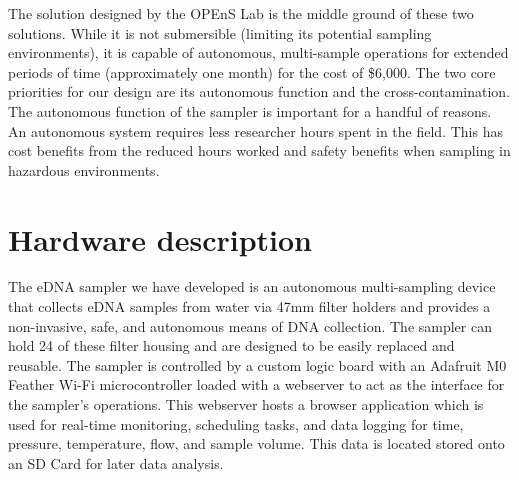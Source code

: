 \documentclass[11pt, letterpaper]{article}
\begin{document}
The solution designed by the OPEnS Lab is the middle ground of these two solutions. While it is not submersible (limiting its potential sampling environments), it is capable of autonomous, multi-sample operations for extended periods of time (approximately one month) for the cost of \$6,000. The two core priorities for our design are its autonomous function and the cross-contamination. The autonomous function of the  sampler is important for a handful of reasons. An autonomous system requires less researcher hours spent in the field. This has cost benefits from the reduced hours worked and safety benefits when sampling in hazardous environments.     



\section{Hardware description}




The eDNA sampler we have developed is an autonomous multi-sampling device that collects eDNA samples from water via 47mm filter holders and provides a non-invasive, safe, and autonomous means of DNA collection. The sampler can hold 24 of these filter housing and are designed to be easily replaced and reusable. The sampler is controlled by a custom logic board with an Adafruit M0 Feather Wi-Fi microcontroller loaded with a webserver to act as the interface for the sampler’s operations. This webserver hosts a browser application which is used for real-time monitoring, scheduling tasks, and data logging for time, pressure, temperature, flow, and sample volume. This data is located stored onto an SD Card for later data analysis. 
\end{document}
